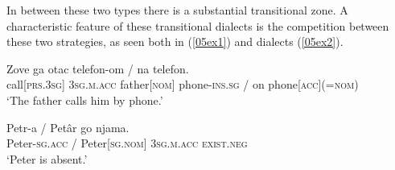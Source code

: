 \documentclass[output=paper,colorlinks,citecolor=brown]{langscibook}
\begin{document}
In between these two types there is a substantial transitional  zone. A characteristic feature of these transitional dialects is the competition between these two strategies, as seen both in  (\ref{05ex1}) and  dialects (\ref{05ex2}).

\begin{exe}
	\ex \label{05ex1}
	\gll Zove ga otac telefon-om / na telefon. \\
	call[\textsc{prs.3sg}] 3\textsc{sg.m.acc} father[\textsc{nom}] phone-\textsc{ins.sg} / on phone[\textsc{acc}](\textsc{=nom}) \\
	\trans `The father calls him by phone.' \hfill \citep[183, 202]{miloradovic2003}
	
	\ex \label{05ex2}
	\gll Petr-a / Petâr go njama. \\
	Peter-\textsc{sg.acc} / Peter[\textsc{sg.nom}] 3\textsc{sg.m.acc} \textsc{exist.neg} \\
	\trans `Peter is absent.' \hfill \citep[163]{stojkov1981}
\end{exe}

\end{document}
